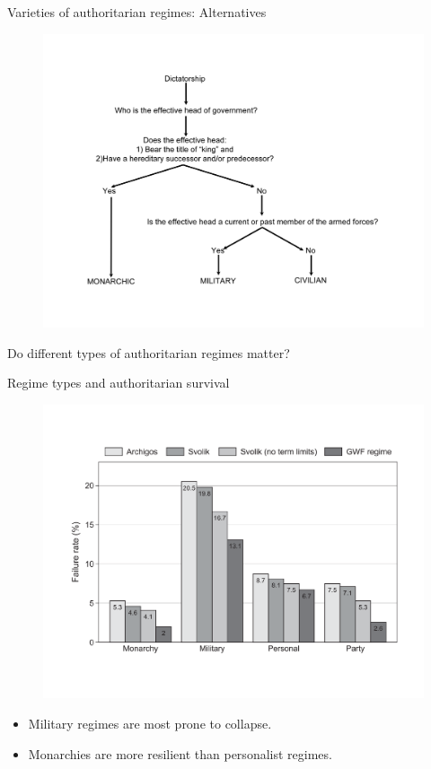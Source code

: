 \documentclass[10pt]{beamer}
\begin{document}
\begin{frame}{Varieties of authoritarian regimes: Alternatives}
	\begin{figure}
	\centering
	\includegraphics[scale=0.45]{Figs/cpg}
	\end{figure}
\end{frame}

\begin{frame}
Do different types of authoritarian regimes matter?
\end{frame}

\begin{frame}{Regime types and authoritarian survival}
	\begin{figure}
	\centering
	\includegraphics[scale=0.32]{Figs/GWF/survival}
	\end{figure}
	\pause
	\begin{itemize}
	\item Military regimes are most prone to collapse.
	\item Monarchies are more resilient than personalist regimes.
	\end{itemize}
\end{frame}
\end{document}
